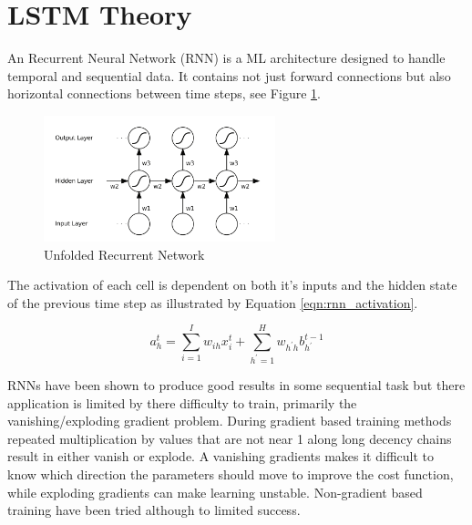 \documentclass[sensors,article,submit,moreauthors,pdftex]{Definitions/mdpi}
\begin{document}
\section{LSTM Theory} 
\label{sec:lstm_therory}
An Recurrent Neural Network (RNN) is a ML architecture designed to handle temporal and sequential data. It contains not just forward connections but also horizontal connections between time steps, see Figure \ref{fig:rnn_structure}.

\begin{figure}[!hbt]
    \centering
    \includegraphics[width=0.6\textwidth]{Figures/lstm/rnn_structure.png}
    \caption{Unfolded Recurrent Network\cite{Graves2012}}
    \label{fig:rnn_structure}
\end{figure}

The activation of each cell is dependent on both it's inputs and the hidden state of the previous time step as illustrated by Equation \ref{eqn:rnn_activation}.\cite{Graves2012}

\begin{equation}
    a_h^t = \sum_{i=1}^I w_{ih}x^t_i + \sum_{h^\prime=1}^H w_{h^\prime h} b_{h^\prime}^{t-1}
    \label{eqn:rnn_activation}
\end{equation}

RNNs have been shown to produce good results in some sequential task but there application is limited by there difficulty to train, primarily the vanishing/exploding gradient problem. During gradient based training methods repeated multiplication  by values that are not near 1 along long decency chains result in either vanish or explode. A vanishing gradients makes it difficult to know which direction the parameters should move to improve the cost function, while exploding gradients can make learning unstable. Non-gradient based training have been tried although to limited success. \cite{Graves2012, Goodfellow2015}
\end{document}
